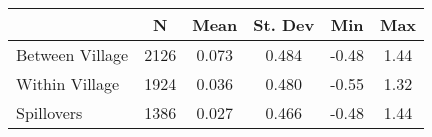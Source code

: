 \begin{tabular}{l*{5}{c}}\hline&\multicolumn{1}{c}{N}&\multicolumn{1}{c}{Mean}&\multicolumn{1}{c}{St. Dev}&\multicolumn{1}{c}{Min}&\multicolumn{1}{c}{Max}\\ \hline 
Between Village & 2126 & 0.073 & 0.484 & -0.48 & 1.44 \\
Within Village & 1924 & 0.036 & 0.480 & -0.55 & 1.32 \\
Spillovers & 1386 & 0.027 & 0.466 & -0.48 & 1.44 \\
\hline \end{tabular}
